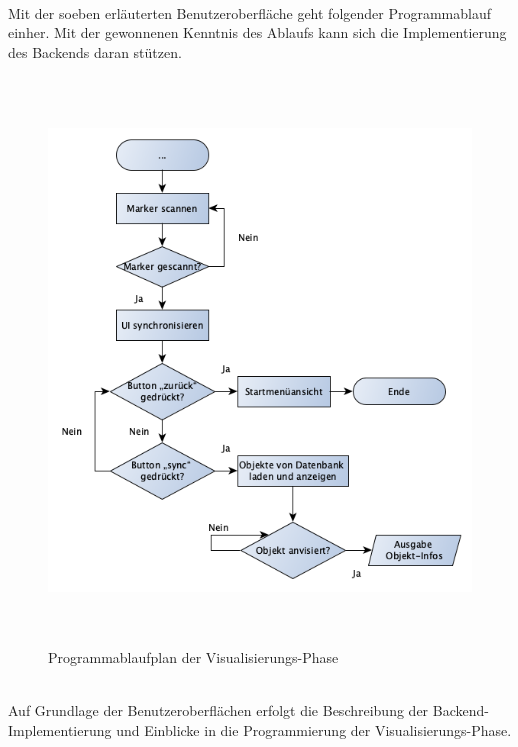 \\ 
Mit der soeben erläuterten Benutzeroberfläche geht folgender Programmablauf einher. Mit der gewonnenen Kenntnis des Ablaufs kann sich die 
Implementierung des Backends daran stützen. 
\begin{figure}[hbt!]
    \centering
    \includegraphics[width=15cm,height=15cm,keepaspectratio]{4Umsetzung/Bilder/visualPAP.png}
    \caption{Programmablaufplan der Visualisierungs-Phase}
    \label{pic:startmenu}
\end{figure}
\\
\linebreak
Auf Grundlage der Benutzeroberflächen erfolgt die Beschreibung der Backend-Implementierung und Einblicke in die Programmierung der Visualisierungs-Phase.

